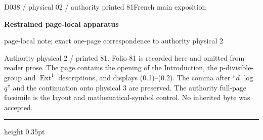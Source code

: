 \documentclass[9pt]{article}
\newcommand{\CanonText}[1]{\par{\fontsize{8.0}{9.35}\selectfont\RaggedRight #1\par}\vspace{2.2pt}}
\newcommand{\LayerTitle}{Restrained page-local apparatus}
\begin{document}
\noindent\begin{minipage}[t][\dimexpr\textheight-5pt\relax][t]{\textwidth}
{\sffamily\fontsize{7.3}{8.2}\selectfont\color{Quiet} D038 / physical 02 / authority printed 81\hfill French main exposition}
\par{}\vspace{4.5pt}
{\sffamily\fontsize{10.4}{11.6}\selectfont\bfseries\color{Accent} \LayerTitle}
\par{\sffamily\fontsize{6.7}{7.7}\selectfont\color{Quiet} page-local note; exact one-page correspondence to authority physical 2}
\vspace{5pt}
\CanonText{Authority physical 2 / printed 81. Folio 81 is recorded here and omitted from reader prose. The page contains the opening of the Introduction, the p-divisible-group and \(\operatorname{Ext}^{1}\) descriptions, and displays (0.1)–(0.2). The comma after “\(d\) \(\operatorname{log}\) \(q\)” and the continuation onto physical 3 are preserved. The authority full-page facsimile is the layout and mathematical-symbol control. No inherited byte was accepted.}
\vfill
{\color{Accent}\hrule height 0.35pt}\vspace{3pt}
\end{minipage}
\newpage
\end{document}
